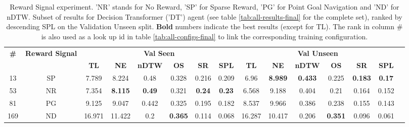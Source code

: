 \begin{table}
\centering
\caption{\label{tab:dt_reward_type}Reward Signal experiment. ’NR’ stands for No Reward, ’SP’ for Sparse Reward, ’PG’ for Point Goal Navigation and ’ND’ for nDTW. Subset of results for Decision Transformer ('DT') agent (see table \ref{tab:all-results-final} for the complete set), ranked by descending SPL on the Validation Unseen split. \textbf{Bold} numbers indicate the best results (except for TL). The rank in column \# is also used as a look up id in table \ref{tab:all-configs-final} to link the corresponding training configuration.}
\begin{tabular}{@{\hskip3pt}c@{\hskip3pt}c@{\hskip3pt}c@{\hskip3pt}c@{\hskip3pt}c@{\hskip3pt}c@{\hskip3pt}c@{\hskip3pt}c@{\hskip3pt}c@{\hskip3pt}c@{\hskip3pt}c@{\hskip3pt}c@{\hskip3pt}c@{\hskip3pt}c@{\hskip3pt}c}
\toprule
                                  \textbf{\#} & \textbf{Reward Signal} & \multicolumn{6}{c}{\textbf{Val Seen}} & \multicolumn{6}{c}{\textbf{Val Unseen}} \\
\cmidrule(l){3-8}\cmidrule(l){9-14}\textbf{~} &             \textbf{~} &       \textbf{TL} &     \textbf{NE} &  \textbf{nDTW} &     \textbf{OS} &    \textbf{SR} &   \textbf{SPL} &         \textbf{TL} &     \textbf{NE} &   \textbf{nDTW} &     \textbf{OS} &     \textbf{SR} &   \textbf{SPL} \\
\midrule
                                           13 &                     SP &             7.789 &           8.224 &           0.48 &           0.328 &          0.216 &          0.209 &                6.96 &  \textbf{8.989} &  \textbf{0.433} &           0.225 &  \textbf{0.183} &  \textbf{0.17} \\
                                           53 &                     NR &             7.354 &  \textbf{8.115} &  \textbf{0.49} &           0.321 &  \textbf{0.24} &  \textbf{0.23} &               6.568 &           9.188 &           0.404 &            0.21 &           0.164 &          0.152 \\
                                           81 &                     PG &             9.125 &           9.047 &          0.442 &           0.325 &          0.195 &          0.182 &               8.537 &           9.966 &           0.386 &           0.238 &           0.155 &          0.143 \\
                                          169 &                     ND &            16.971 &          11.422 &            0.2 &  \textbf{0.365} &          0.114 &          0.068 &              16.287 &          10.417 &           0.206 &  \textbf{0.351} &           0.096 &          0.061 \\
\bottomrule
\end{tabular}
\end{table}
